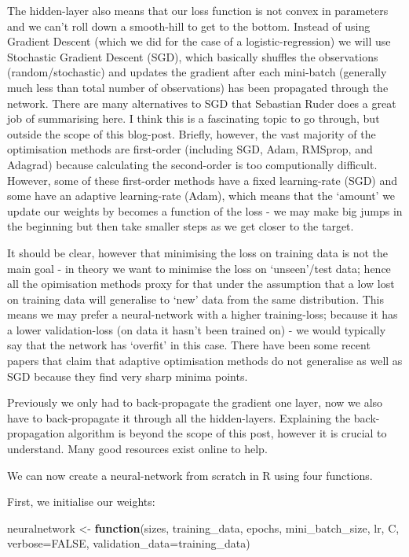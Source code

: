 \documentclass[]{book}
\newenvironment{Shaded}{\begin{snugshade}}{\end{snugshade}}
\newcommand{\ControlFlowTok}[1]{\textcolor[rgb]{0.13,0.29,0.53}{\textbf{#1}}}
\newcommand{\DataTypeTok}[1]{\textcolor[rgb]{0.13,0.29,0.53}{#1}}
\newcommand{\NormalTok}[1]{#1}
\newcommand{\OtherTok}[1]{\textcolor[rgb]{0.56,0.35,0.01}{#1}}
\newcommand{\StringTok}[1]{\textcolor[rgb]{0.31,0.60,0.02}{#1}}
\begin{document}
The hidden-layer also means that our loss function is not convex in parameters and we can't roll down a smooth-hill to get to the bottom. Instead of using Gradient Descent (which we did for the case of a logistic-regression) we will use Stochastic Gradient Descent (SGD), which basically shuffles the observations (random/stochastic) and updates the gradient after each mini-batch (generally much less than total number of observations) has been propagated through the network. There are many alternatives to SGD that Sebastian Ruder does a great job of summarising here. I think this is a fascinating topic to go through, but outside the scope of this blog-post. Briefly, however, the vast majority of the optimisation methods are first-order (including SGD, Adam, RMSprop, and Adagrad) because calculating the second-order is too computionally difficult. However, some of these first-order methods have a fixed learning-rate (SGD) and some have an adaptive learning-rate (Adam), which means that the `amount' we update our weights by becomes a function of the loss - we may make big jumps in the beginning but then take smaller steps as we get closer to the target.

It should be clear, however that minimising the loss on training data is not the main goal - in theory we want to minimise the loss on `unseen'/test data; hence all the opimisation methods proxy for that under the assumption that a low lost on training data will generalise to `new' data from the same distribution. This means we may prefer a neural-network with a higher training-loss; because it has a lower validation-loss (on data it hasn't been trained on) - we would typically say that the network has `overfit' in this case. There have been some recent papers that claim that adaptive optimisation methods do not generalise as well as SGD because they find very sharp minima points.

Previously we only had to back-propagate the gradient one layer, now we also have to back-propagate it through all the hidden-layers. Explaining the back-propagation algorithm is beyond the scope of this post, however it is crucial to understand. Many good resources exist online to help.

We can now create a neural-network from scratch in R using four functions.

First, we initialise our weights:

\begin{Shaded}
\begin{Highlighting}[]
\NormalTok{neuralnetwork <-}\StringTok{ }\ControlFlowTok{function}\NormalTok{(sizes, training_data, epochs, }
\NormalTok{  mini_batch_size, lr, C, }\DataTypeTok{verbose=}\OtherTok{FALSE}\NormalTok{, }
  \DataTypeTok{validation_data=}\NormalTok{training_data)}
\end{Highlighting}
\end{Shaded}
\end{document}
